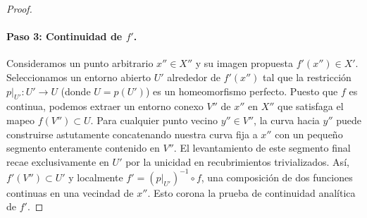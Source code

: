 \documentclass[11pt,a4paper]{article}
\theoremstyle{definition}
\theoremstyle{remark}
\numberwithin{equation}{section}
\begin{document}
\begin{proof}
\paragraph{Paso 3: Continuidad de $f'$.} Consideramos un punto arbitrario $x'' \in X''$ y su imagen propuesta $f'(x'') \in X'$. Seleccionamos un entorno abierto $U'$ alrededor de $f'(x'')$ tal que la restricción $p|_{U'} : U' \to U$ (donde $U = p(U')$) es un homeomorfismo perfecto. Puesto que $f$ es continua, podemos extraer un entorno conexo $V''$ de $x''$ en $X''$ que satisfaga el mapeo $f(V'') \subset U$. 
Para cualquier punto vecino $y'' \in V''$, la curva hacia $y''$ puede construirse astutamente concatenando nuestra curva fija a $x''$ con un pequeño segmento enteramente contenido en $V''$. El levantamiento de este segmento final recae exclusivamente en $U'$ por la unicidad en recubrimientos trivializados. Así, $f'(V'') \subset U'$ y localmente $f' = (p|_{U'})^{-1} \circ f$, una composición de dos funciones continuas en una vecindad de $x''$. Esto corona la prueba de continuidad analítica de $f'$.
\end{proof}
\end{document}
